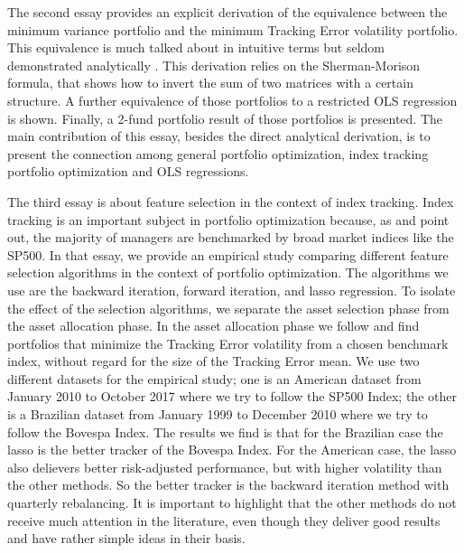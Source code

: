 \documentclass[12pt,oneside,a4paper]{memoir}
\begin{document}
The second essay provides an explicit derivation of the equivalence between the minimum variance portfolio and the minimum Tracking Error volatility portfolio.
This equivalence is much talked about in intuitive terms but seldom demonstrated analytically \cite{liu-2009, demol2016}.
This derivation relies on the Sherman-Morison formula, that shows how to invert the sum of two matrices with a certain structure.
A further equivalence of those portfolios to a restricted OLS regression is shown.
Finally, a 2-fund portfolio result of those portfolios is presented.
The main contribution of this essay, besides the direct analytical derivation, is to present the connection among general portfolio optimization, index tracking portfolio optimization and OLS regressions.

The third essay is about feature selection in the context of index tracking.
Index tracking is an important subject in portfolio optimization because, as  and  point out, the majority of managers are benchmarked by broad market indices like the SP500.
In that essay, we provide an empirical study comparing different feature selection algorithms in the context of portfolio optimization.
The algorithms we use are the backward iteration, forward iteration, and lasso regression.
To isolate the effect of the selection algorithms, we separate the asset selection phase from the asset allocation phase.
In the asset allocation phase we follow  and find portfolios that minimize the Tracking Error volatility from a chosen benchmark index, without regard for the size of the Tracking Error mean.
We use two different datasets for the empirical study; one is an American dataset from January 2010 to October 2017 where we try to follow the SP500 Index; the other is a Brazilian dataset from January 1999 to December 2010 where we try to follow the Bovespa Index.
The results we find is that for the Brazilian case the lasso is the better tracker of the Bovespa Index.
For the American case, the lasso also delievers better risk-adjusted performance, but with higher volatility than the other methods.
So the better tracker is the backward iteration method with quarterly rebalancing.
It is important to highlight that the other methods do not receive much attention in the literature, even though they deliver good results and have rather simple ideas in their basis.

\postextual


\renewcommand\bibname{REFERENCES}


\end{document}
